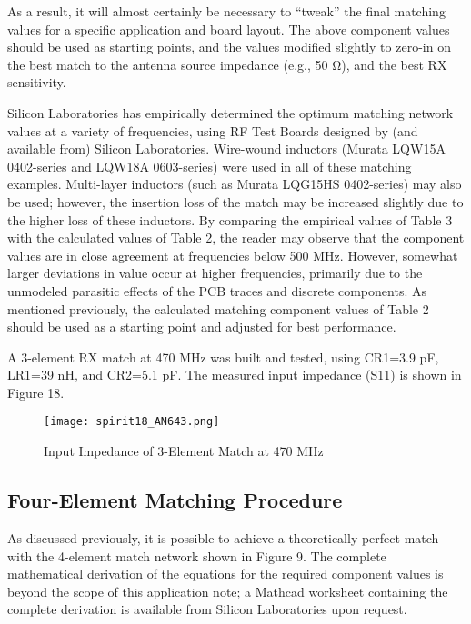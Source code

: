         As a result, it will almost certainly be necessary to “tweak” the final matching values for 
        a specific application and board layout. The above component values should be used as 
        starting points, and the values modified slightly to zero-in on the best match to the 
        antenna source impedance (e.g., 50 Ω), and the best RX sensitivity.
        
        Silicon Laboratories has empirically determined the optimum matching network values at a 
        variety of frequencies, using RF Test Boards designed by (and available from) Silicon 
        Laboratories. Wire-wound inductors (Murata LQW15A 0402-series and LQW18A 0603-series) were 
        used in all of these matching examples. Multi-layer inductors (such as Murata LQG15HS 
        0402-series) may also be used; however, the insertion loss of the match may be increased 
        slightly due to the higher loss of these inductors. By comparing the empirical values of 
        Table 3 with the calculated values of Table 2, the reader may observe that the component 
        values are in close agreement at frequencies below 500 MHz. However, somewhat larger 
        deviations in value occur at higher frequencies, primarily due to the unmodeled 
        parasitic effects of the PCB traces and discrete components. As mentioned previously, the 
        calculated matching component values of Table 2 should be used as a starting point and 
        adjusted for best performance.
        
        A 3-element RX match at 470 MHz was built and tested, using CR1=3.9 pF, LR1=39 nH, and 
        CR2=5.1 pF. The measured input impedance (S11) is shown in Figure 18.
        
        \begin{figure}[ht!] %
          \centering
          \texttt{[image: spirit18\_AN643.png]}
          \caption{Input Impedance of 3-Element Match at 470 MHz \cite[s.~14]{AN643SiliconLabs}}
          \label{EXP001:fig_spirit18}
        \end{figure}
        
    \subsection{Four-Element Matching Procedure}
      As discussed previously, it is possible to achieve a theoretically-perfect match with the 
      4-element match network shown in Figure 9. The complete mathematical derivation of the 
      equations for the required component values is beyond the scope of this application note; a 
      Mathcad worksheet containing the complete derivation is available from Silicon Laboratories 
      upon request.
      
